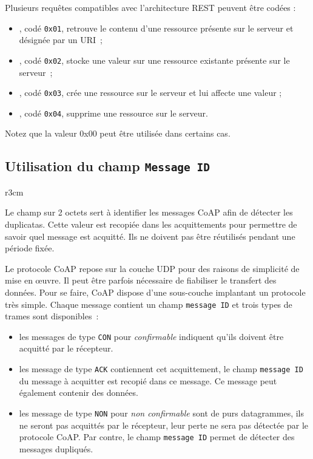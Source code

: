 Plusieurs requêtes compatibles avec l’architecture REST peuvent être codées : 
\begin{itemize}
    \item {}, codé \texttt{0x01}, retrouve le contenu d’une ressource présente sur le serveur et désignée par un URI~;
    \item {}, codé \texttt{0x02}, stocke une valeur sur une ressource existante présente sur le serveur~;
    \item {}, codé \texttt{0x03}, crée une ressource sur le serveur et lui affecte une valeur ;
    \item {}, codé \texttt{0x04}, supprime une ressource sur le serveur.

\end{itemize}

Notez que la valeur 0x00 peut être utilisée dans certains cas.

\subsection{Utilisation du champ \texttt{Message ID}}

\begin{wrapfigure}{r}{3cm}
\end{wrapfigure}


Le champ \texttt{} sur 2 octets sert à identifier les messages CoAP afin de détecter les duplicatas. Cette valeur est recopiée dans les acquittements pour permettre de savoir quel message est acquitté. Ils ne doivent pas être réutilisés pendant une période fixée.



         \vspace{1em}


 Le protocole CoAP repose sur la couche UDP pour des raisons de simplicité de mise en œuvre. Il peut être parfois nécessaire de fiabiliser le transfert des données. Pour se faire, CoAP dispose d'une sous-couche implantant un protocole très simple. Chaque message contient un champ \texttt{message ID} et trois types de trames sont disponibles~:

\begin{itemize}
\item les messages de type \texttt{CON} pour \textit{confirmable} indiquent qu'ils doivent être acquitté par le récepteur.
\item les message de type \texttt{ACK} contiennent cet acquittement, le champ \texttt{message ID} du message à acquitter est recopié dans ce message. Ce message peut également contenir des données.
\item les message de type \texttt{NON} pour \textit{non confirmable} sont de purs datagrammes, ils ne seront pas acquittés par le récepteur, leur perte ne sera pas détectée  par le protocole CoAP.  Par contre, le champ \texttt{message ID} permet de détecter des messages dupliqués.
\end{itemize}

